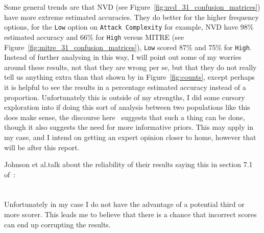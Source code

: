 \documentclass[12pt]{article}
\begin{document}
Some general trends are that NVD (see Figure~\ref{fig:nvd_31_confusion_matrices}) have more extreme
estimated accuracies. They do better for the higher frequency options, for the \texttt{Low} option
on \texttt{Attack Complexity} for example, NVD have 98\% estimated accuracy and 66\% for
\texttt{High} versus MITRE (see Figure~\ref{fig:mitre_31_confusion_matrices}), \texttt{Low} scored
87\% and 75\% for \texttt{High}. Instead of further analysing in this way, I will point out some of
my worries around these results, not that they are wrong per se, but that they do not really tell us
anything extra than that shown by in Figure~\ref{fig:counts}, except perhaps it is helpful to see
the results in a percentage estimated accuracy instead of a proportion. Unfortunately this is
outside of my strengths, I did some cursory exploration into if doing this sort of analysis
between two populations like this does make sense, the discourse here~\cite{stat_modeling} suggests
that such a thing can be done, though it also suggests the need for more informative priors. This
may apply in my case, and I intend on getting an expert opinion closer to home, however that will be
after this report.

Johnson et al.\@ talk about the reliability of their results saying this in section 7.1 of~\cite{bayes}:\\ \\

\textit{} \\

Unfortunately in my case I do not have the advantage of a potential third or more scorer. This leads
me to believe that there is a chance that incorrect scores can end up corrupting the results.
\end{document}
